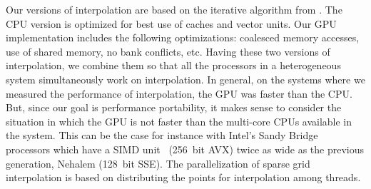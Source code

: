 Our versions of interpolation are based on the iterative algorithm from \cite{murarasu2011}. 
 The CPU version is optimized for best use of caches and vector units. Our GPU implementation includes the following optimizations: coalesced memory accesses, use of shared memory, no bank conflicts, etc. Having these two versions of interpolation, we combine them so that all the processors in a heterogeneous system simultaneously work on interpolation. In general, on the systems where we measured the performance of interpolation, the GPU was faster than the CPU. But, since our goal is performance portability, it makes sense to consider the situation in which the GPU is not faster than the multi-core CPUs available in the system. This can be the case for instance with Intel's Sandy Bridge processors which have a SIMD unit~\cite{avx} (256~bit AVX) twice as wide as the previous generation, Nehalem (128~bit SSE). The parallelization of sparse grid interpolation is based on distributing the points for interpolation among threads. 
